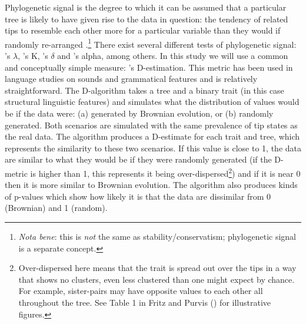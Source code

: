 \documentclass[12pt,letterpaper]{article}
\begin{document}
Phylogenetic signal is the degree to which it can be assumed that a particular tree is likely to have given rise to the data in question: the tendency of related tips to resemble each other more for a particular variable than they would if randomly re-arranged \citep[905]{blomberg2002tempo}.\footnote{\textit{Nota bene}: this is \textit{not} the same as stability/conservatism; phylogenetic signal is a separate concept.} There exist several different tests of phylogenetic signal: \citet{pagel1999inferring}'s $\lambda$, \citet{blomberg2003testing}'s K, \citet{borges2019measuring}'s $\delta$ and \citet{ives2010phylogenetic}'s alpha, among others. In this study we will use a common and conceptually simple measure: \citet{fritz2010selectivity}'s D-estimation. This metric has been used in language studies on sounds \citep{macklin2021phylogenetic} and grammatical features \citep{hubler2022phylogenetic} and is relatively straightforward. The D-algorithm takes a tree and a binary trait (in this case structural linguistic features) and simulates what the distribution of values would be if the data were: (a) generated by Brownian evolution, or (b) randomly generated. Both scenarios are simulated with the same prevalence of tip states as the real data. The algorithm produces a D-estimate for each trait and tree, which represents the similarity to these two scenarios. If this value is close to 1, the data are similar to what they would be if they were randomly generated (if the D-metric is higher than 1, this represents it being over-dispersed\footnote{Over-dispersed here means that the trait is spread out over the tips in a way that shows no clusters, even less clustered than one might expect by chance. For example, sister-pairs may have opposite values to each other all throughout the tree. See Table 1 in Fritz and Purvis (\citeyear[1044]{fritz2010selectivity}) for illustrative figures.}) and if it is near 0 then it is more similar to Brownian evolution. The algorithm also produces kinds of p-values which show how likely it is that the data are dissimilar from 0 (Brownian) and 1 (random).
\end{document}
